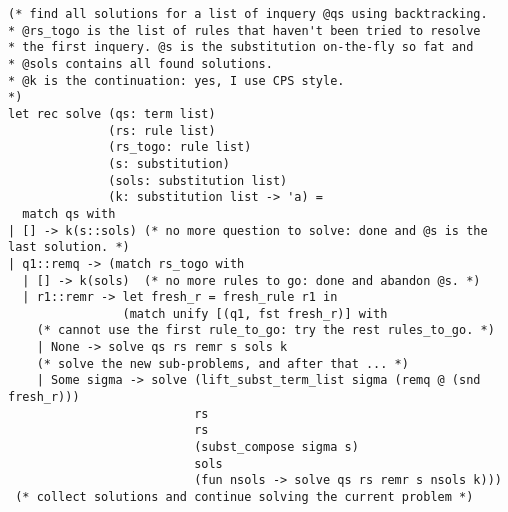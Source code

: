 \documentclass{article}
\begin{document}
\begin{verbatim}
(* find all solutions for a list of inquery @qs using backtracking.
* @rs_togo is the list of rules that haven't been tried to resolve
* the first inquery. @s is the substitution on-the-fly so fat and
* @sols contains all found solutions.
* @k is the continuation: yes, I use CPS style.
*)
let rec solve (qs: term list)
              (rs: rule list)
              (rs_togo: rule list) 
              (s: substitution) 
              (sols: substitution list) 
              (k: substitution list -> 'a) =
  match qs with
| [] -> k(s::sols) (* no more question to solve: done and @s is the last solution. *)
| q1::remq -> (match rs_togo with
  | [] -> k(sols)  (* no more rules to go: done and abandon @s. *)
  | r1::remr -> let fresh_r = fresh_rule r1 in
                (match unify [(q1, fst fresh_r)] with
    (* cannot use the first rule_to_go: try the rest rules_to_go. *)
    | None -> solve qs rs remr s sols k 
    (* solve the new sub-problems, and after that ... *)
    | Some sigma -> solve (lift_subst_term_list sigma (remq @ (snd fresh_r)))   
                          rs
                          rs 
                          (subst_compose sigma s) 
                          sols 
                          (fun nsols -> solve qs rs remr s nsols k)))
 (* collect solutions and continue solving the current problem *)

\end{verbatim}
\end{document}

